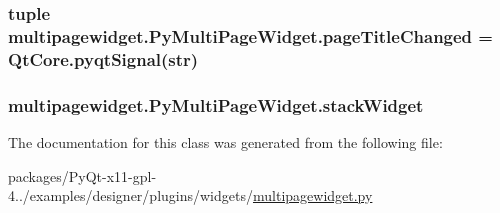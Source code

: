 \subsubsection[{page\+Title\+Changed}]{\setlength{\rightskip}{0pt plus 5cm}tuple multipagewidget.\+Py\+Multi\+Page\+Widget.\+page\+Title\+Changed = Qt\+Core.\+pyqt\+Signal(str)\hspace{0.3cm}{\ttfamily [static]}}\label{classmultipagewidget_1_1PyMultiPageWidget_a051f26314dede77f797a8bbfeeaa1814}
\hypertarget{classmultipagewidget_1_1PyMultiPageWidget_a8373c4475e4cd3b6c2624fbd35cbfb1e}{}
\subsubsection[{stack\+Widget}]{\setlength{\rightskip}{0pt plus 5cm}multipagewidget.\+Py\+Multi\+Page\+Widget.\+stack\+Widget}\label{classmultipagewidget_1_1PyMultiPageWidget_a8373c4475e4cd3b6c2624fbd35cbfb1e}


The documentation for this class was generated from the following file\+:\begin{DoxyCompactItemize}
\item 
packages/\+Py\+Qt-\/x11-\/gpl-\/4../examples/designer/plugins/widgets/\hyperlink{multipagewidget_8py}{multipagewidget.\+py}\end{DoxyCompactItemize}
